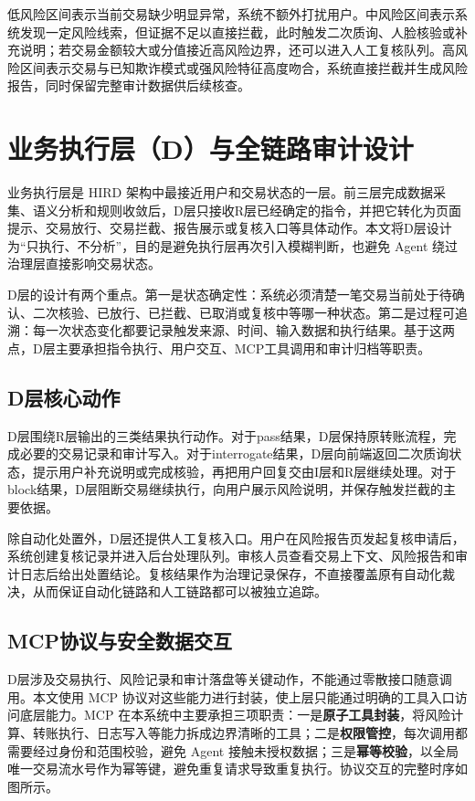 \documentclass{xduugthesis}
\begin{document}
低风险区间表示当前交易缺少明显异常，系统不额外打扰用户。中风险区间表示系统发现一定风险线索，但证据不足以直接拦截，此时触发二次质询、人脸核验或补充说明；若交易金额较大或分值接近高风险边界，还可以进入人工复核队列。高风险区间表示交易与已知欺诈模式或强风险特征高度吻合，系统直接拦截并生成风险报告，同时保留完整审计数据供后续核查。


\section{业务执行层（D）与全链路审计设计}

业务执行层是 HIRD 架构中最接近用户和交易状态的一层。前三层完成数据采集、语义分析和规则收敛后，D层只接收R层已经确定的指令，并把它转化为页面提示、交易放行、交易拦截、报告展示或复核入口等具体动作。本文将D层设计为“只执行、不分析”，目的是避免执行层再次引入模糊判断，也避免 Agent 绕过治理层直接影响交易状态。

D层的设计有两个重点。第一是状态确定性：系统必须清楚一笔交易当前处于待确认、二次核验、已放行、已拦截、已取消或复核中等哪一种状态。第二是过程可追溯：每一次状态变化都要记录触发来源、时间、输入数据和执行结果。基于这两点，D层主要承担指令执行、用户交互、MCP工具调用和审计归档等职责。

\subsection{D层核心动作}

D层围绕R层输出的三类结果执行动作。对于pass结果，D层保持原转账流程，完成必要的交易记录和审计写入。对于interrogate结果，D层向前端返回二次质询状态，提示用户补充说明或完成核验，再把用户回复交由I层和R层继续处理。对于block结果，D层阻断交易继续执行，向用户展示风险说明，并保存触发拦截的主要依据。

除自动化处置外，D层还提供人工复核入口。用户在风险报告页发起复核申请后，系统创建复核记录并进入后台处理队列。审核人员查看交易上下文、风险报告和审计日志后给出处置结论。复核结果作为治理记录保存，不直接覆盖原有自动化裁决，从而保证自动化链路和人工链路都可以被独立追踪。

\subsection{MCP协议与安全数据交互}

D层涉及交易执行、风险记录和审计落盘等关键动作，不能通过零散接口随意调用。本文使用 MCP 协议对这些能力进行封装，使上层只能通过明确的工具入口访问底层能力。MCP 在本系统中主要承担三项职责：一是\textbf{原子工具封装}，将风险计算、转账执行、日志写入等能力拆成边界清晰的工具；二是\textbf{权限管控}，每次调用都需要经过身份和范围校验，避免 Agent 接触未授权数据；三是\textbf{幂等校验}，以全局唯一交易流水号作为幂等键，避免重复请求导致重复执行。协议交互的完整时序如图所示。
\end{document}
